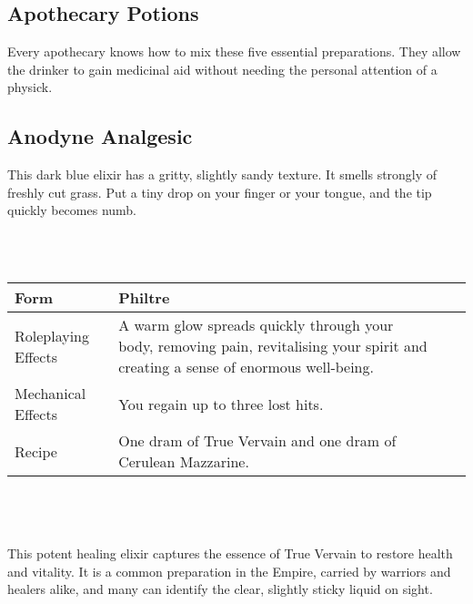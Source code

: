 \documentclass[a5paper,pagesize,10pt,bibtotoc,pointlessnumbers,
normalheadings,DIV=9,twoside=false]{scrbook}
\newcommand\potion[7]{
    \section{#1}
    #2
    \\\\
    \begin{tabular}{| p{.2\linewidth} | p{.72\textwidth} |}
        \hline
        Form & #3 \\
        \hline
        Roleplaying Effects & #4 \\
        \hline
        Mechanical Effects & #5 \\
        \hline
        Recipe & #6 \\
        \hline
    \end{tabular}
    \\\\\\
    #7
    \newpage
}
\newcommand\mychapter[2]{
    \topskip0pt
    \vspace*{\fill}
    \begin{it}
    \chapter{#1}
        #2
    \end{it}
    \vspace*{\fill}
    \newpage
}
\begin{document}
\mychapter{Apothecary Potions}{
    Every apothecary knows how to mix these five essential preparations. They allow the drinker to gain medicinal aid without needing the personal attention of a physick.
}

\potion{Anodyne Analgesic}{
    This dark blue elixir has a gritty, slightly sandy texture. It smells strongly of freshly cut grass. Put a tiny drop on your finger or your tongue, and the tip quickly becomes numb.
}{Philtre}{
    The liquid numbs the pain of your injuries, and provides an invigoration that quickly clears your mind.
}{
    You can overcome the roleplaying effect of a single traumatic wound of your choice until the end of the current engagement. 
}{
    One dram of Marrowort and one dram of True Vervain.
}{
    Replacing the more cumbersome Anodyne Embrocation, this potent elixir numbs pain, and helps clear and focus the mind of the drinker. The philtre is not without its dangers; while it allows the imbiber to overcome many of the effects of a traumatic injury, it does nothing to actually treat the effects of such wounds. More than one soldier has dropped dead after using the potion to allow them to ignore a serious condition that required immediate medical attention. It can also be used to alleviate the symptoms of painful medical conditions such as inflamed joints, arthritis and rheumatism, but the cost of doing so with a potion tends to place this option outside the reach of all save the most wealthy.
}

\potion{Bloodharrow Philtre}{
    This translucent red liquid has tiny white particles suspended in it. It has a spicy scent, and a tiny amount on your tongue or your finger tingles unpleasantly for a moment.
}{Philtre}{
    Pain spreads rapidly through your body; you feel as if your blood is on fire. After a moment or two, the pain fades.
}{
    You lose the venom condition.
}{    
    One dram Imperial Roseweald and one dram of Marrowort.
}{
    A thin, slightly toxic elixir that harrows the blood of the one who drinks it. After a moment or two of agonising pain, the body is purged of venom, and of some minor poisons.
}

\potion{Elixir Vitae}{
    This translucent liquid is tinted a pale blue-green. It has a clean, fresh scent. A tiny drop of the sticky fluid on your tongue or your finger tingles pleasantly for a moment.
}{Philtre}{
    A warm glow spreads quickly through your body, removing pain, revitalising your spirit and creating a sense of enormous well-being.
}{
    You regain up to three lost hits.
}{
    One dram of True Vervain and one dram of Cerulean Mazzarine.
}{
    This potent healing elixir captures the essence of True Vervain to restore health and vitality. It is a common preparation in the Empire, carried by warriors and healers alike, and many can identify the clear, slightly sticky liquid on sight.
}
\end{document}
